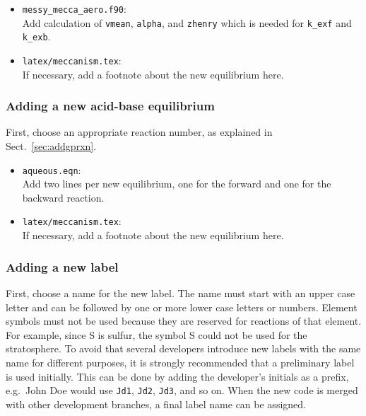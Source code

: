 \documentclass[twoside]{article}
\def\nosep{\setlength\parsep{0mm}\setlength\topsep{0mm}\setlength\itemsep{0mm}}
\begin{document}
\begin{itemize}\nosep
\item \verb|messy_mecca_aero.f90|:\\
  Add calculation of \verb|vmean|, \verb|alpha|, and \verb|zhenry| which
  is needed for \verb|k_exf| and \verb|k_exb|.
\end{itemize}

\begin{itemize}\nosep
\item \verb|latex/meccanism.tex|:\\
  If necessary, add a footnote about the new equilibrium here.
\end{itemize}

\subsubsection{Adding a new acid-base equilibrium}

First, choose an appropriate reaction number, as explained in
Sect.~\ref{sec:addgprxn}.

\begin{itemize}\nosep
\item \verb|aqueous.eqn|:\\
  Add two lines per new equilibrium, one for the forward and one for the
  backward reaction.
\end{itemize}

\begin{itemize}\nosep
\item \verb|latex/meccanism.tex|:\\
  If necessary, add a footnote about the new equilibrium here.
\end{itemize}

\subsubsection{Adding a new label}
\label{sec:newlabel}

First, choose a name for the new label. The name must start with an
upper case letter and can be followed by one or more lower case letters
or numbers. Element symbols must not be used because they are reserved
for reactions of that element. For example, since S is sulfur, the
symbol S could not be used for the stratosphere. To avoid that several
developers introduce new labels with the same name for different
purposes, it is strongly recommended that a preliminary label is used
initially. This can be done by adding the developer's initials as a
prefix, e.g.\ John Doe would use \verb|Jd1|, \verb|Jd2|, \verb|Jd3|, and
so on. When the new code is merged with other development branches, a
final label name can be assigned.
\end{document}
